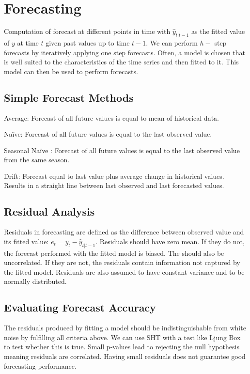 \documentclass[10pt, a4paper]{article}
\begin{document}
\section{Forecasting}
Computation of forecast at different points in time with $ \hat{y}_{t|t-1} $ as the fitted value of $ y $ at time $ t $ given past values up to time $ t - 1 $.
We can perform $ h-$ step forecasts by iteratively applying one step forecasts.
Often, a model is chosen that is well suited to the characteristics of the time series and then fitted to it. This model can then be used to perform forecasts.

\subsection{Simple Forecast Methods}
Average: Forecast of all future values is equal to mean of historical data.

Naïve: Forecast of all future values is equal to the last observed value.

Seasonal Naïve : Forecast of all future values is equal to the last observed value from the same season.

Drift: Forecast equal to last value plus average change in historical values. Results in a straight line between last observed and last forecasted values.

\subsection{Residual Analysis}
Residuals in forecasting are defined as the difference between observed value and its fitted value: $ e_t = y_t - \hat{y}_{t|t-1} $.
Residuals should have zero mean. If they do not, the forecast performed with the fitted model is biased. The should also be uncorrelated.
If they are not, the residuals contain information not captured by the fitted model. Residuals are also assumed to have constant variance and to be normally distributed.

\subsection{Evaluating Forecast Accuracy}
The residuals produced by fitting a model should be indistinguishable from white noise by fulfilling all criteria above.
We can use SHT with a test like Ljung Box to test whether this is true.
Small p-values lead to rejecting the null hypothesis meaning residuals are correlated.
Having small residuals does not guarantee good forecasting performance.
\end{document}
